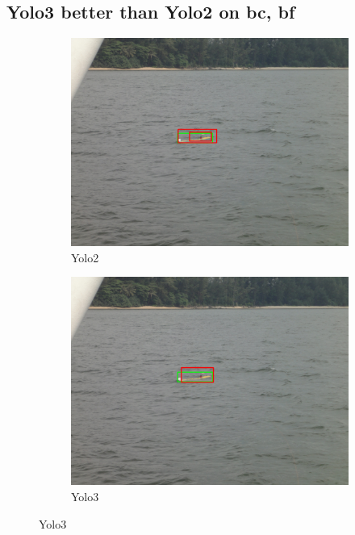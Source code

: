 \subsection{Yolo3 better than Yolo2 on bc, bf}
\label{sec:3better}
\begin{figure}[h!]
\begin{subfigure}{.5\textwidth}
  \centering
  \includegraphics[width=0.9\linewidth]{results/case_buildings/yolo23/3better/yolo2/DSC02490.jpg}
  \caption{Yolo2}
\end{subfigure}%
\begin{subfigure}{.5\textwidth}
  \centering
  \includegraphics[width=.9\linewidth]{results/case_buildings/yolo23/3better/yolo3/DSC02490.jpg}
  \caption{Yolo3}
\end{subfigure}


\end{figure}
